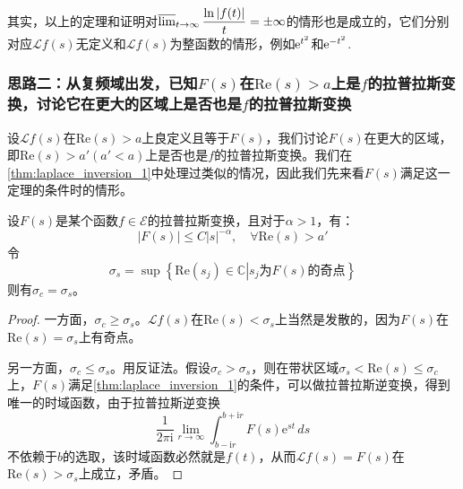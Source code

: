 其实，以上的定理和证明对$\varlimsup_{t\to\infty}\dfrac{\ln|f(t)|}{t}=\pm\infty$的情形也是成立的，它们分别对应$\mathcal{L} f(s)$无定义和$\mathcal{L} f(s)$为整函数的情形，例如$\mathrm{e}^{t^2}$和$\mathrm{e}^{-t^2}$.

\subsubsection{思路二：从复频域出发，已知$F(s)$在$\mathrm{Re}(s)>a$上是$f$的拉普拉斯变换，讨论它在更大的区域上是否也是$f$的拉普拉斯变换}

设$\mathcal{L} f(s)$在$\mathrm{Re}(s)>a$上良定义且等于$F(s)$，我们讨论$F(s)$在更大的区域，即$\mathrm{Re}(s)>a'(a'<a)$上是否也是$f$的拉普拉斯变换。我们在\cref{thm:laplace_inversion_1}中处理过类似的情况，因此我们先来看$F(s)$满足这一定理的条件时的情形。

\begin{theorem}
    设$F(s)$是某个函数$f\in\mathcal{E} $的拉普拉斯变换，且对于$\alpha>1$，有：
    $$|F(s)|\leq C|s|^{-\alpha},\quad \forall \mathrm{Re}(s)>a'$$
    令
    \[\sigma_s=\sup\left\{\mathrm{Re}(s_j)\in\mathbb{C}\left|s_j\text{为}F(s)\text{的奇点}\right.\right\}\]
    则有$\sigma_c=\sigma_s$。
\end{theorem}
\begin{proof}
    一方面，$\sigma_c\geq\sigma_s$。$\mathcal{L} f(s)$在$\mathrm{Re}(s)<\sigma_s$上当然是发散的，因为$F(s)$在$\mathrm{Re}(s)=\sigma_s$上有奇点。

    另一方面，$\sigma_c\leq\sigma_s$。用反证法。假设$\sigma_c>\sigma_s$，则在带状区域$\sigma_s<\mathrm{Re}(s)\leq\sigma_c$上，$F(s)$满足\cref{thm:laplace_inversion_1}的条件，可以做拉普拉斯逆变换，得到唯一的时域函数，由于拉普拉斯逆变换
    $$\frac{1}{2\pi \mathrm{i}}\lim_{r\to\infty}\int_{b-\mathrm{i}r}^{b+\mathrm{i}r}F(s)\mathrm{e}^{st}\,ds$$
    不依赖于$b$的选取，该时域函数必然就是$f(t)$，从而$\mathcal{L} f(s)=F(s)$在$\mathrm{Re}(s)>\sigma_s$上成立，矛盾。
\end{proof}

